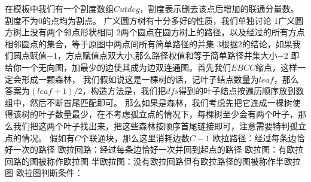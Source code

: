 {}在模板中我们有一个割度数组$ Cutdeg $，割度表示删去该点后增加的联通分量数。割度不为$ 0 $的点均为割点。\markdownRendererInterblockSeparator
{}\markdownRendererInterblockSeparator
{}广义圆方树有十分多好的性质，我们单独讨论\markdownRendererParagraphSeparator
{}$ 1 $广义圆方树上没有两个邻点形状相同\markdownRendererParagraphSeparator
{}$ 2 $两个圆点在圆方树上的路径，以及经过的所有方点相邻圆点的集合，等于原图中两点间所有简单路径的并集\markdownRendererParagraphSeparator
{}$ 3 $根据$ 2 $的结论，如果我们圆点赋值$ -1 $，方点赋值点双大小,那么路径权值和等于简单路径并集大小$ -2 $\markdownRendererInterblockSeparator
{}
\markdownRendererSectionEnd \markdownRendererSectionBegin
{}\markdownRendererInterblockSeparator
{}\markdownRendererInterblockSeparator
{}
\markdownRendererSectionEnd \markdownRendererSectionBegin
{}\markdownRendererInterblockSeparator
{}\markdownRendererInterblockSeparator
{}
\markdownRendererSectionEnd \markdownRendererSectionBegin
{}\markdownRendererInterblockSeparator
{}即给你一个无向图，加最少的边使其成为边双连通图。首先我们$ EBCC $缩点，这样一定会形成一颗森林，\markdownRendererParagraphSeparator
{}我们假如说这是一棵树的话，记叶子结点数量为$ leaf $，那么答案为$ (leaf+1)/2 $，构造方法是，我们把$ dfs $得到的叶子结点按遍历顺序放到数组中，然后不断首尾匹配即可。\markdownRendererParagraphSeparator
{}那么如果是森林，我们考虑先把它连成一棵树使得该树的叶子数量最少，在不考虑孤立点的情况下，每棵树至少会有两个叶子，那么我们把这两个叶子找出来，把这些森林按顺序首尾链接即可，注意需要特判孤立点的情况。\markdownRendererParagraphSeparator
{}假如有$ C $个联通块，那么这里消耗边数$ C-1 $\markdownRendererInterblockSeparator
{}
\markdownRendererSectionEnd 
\markdownRendererSectionEnd 
\markdownRendererSectionEnd \markdownRendererSectionBegin
{}\markdownRendererInterblockSeparator
{}欧拉路径：经过每条边恰好一次的路径\markdownRendererParagraphSeparator
{}欧拉回路：经过每条边恰好一次并回到起点的路径\markdownRendererParagraphSeparator
{}欧拉图：有欧拉回路的图被称作欧拉图\markdownRendererParagraphSeparator
{}半欧拉图：没有欧拉回路但有欧拉路径的图被称作半欧拉图\markdownRendererParagraphSeparator
{}欧拉图判断条件：\markdownRendererParagraphSeparator
